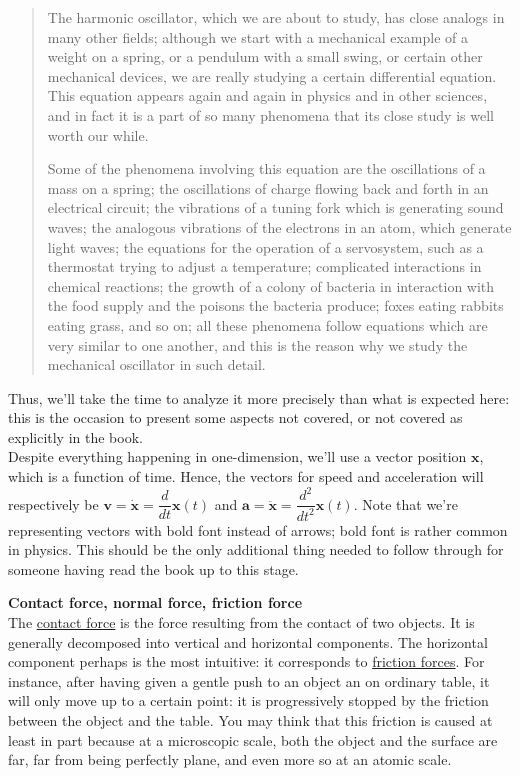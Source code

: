 \documentclass[solutions.tex]{subfiles}
\renewcommand{\bm}[1]{\pmb{#1}}
\begin{document}
\begin{quote}
The harmonic oscillator, which we are about to study, has close analogs in many
other fields; although we start with a mechanical example of a weight on a spring,
or a pendulum with a small swing, or certain other mechanical devices, we are
really studying a certain differential equation. This equation appears again
and again in physics and in other sciences, and in fact it is a part of so
many phenomena that its close study is well worth our while.

Some of the phenomena involving this equation are the oscillations of a
mass on a spring; the oscillations of charge flowing back and forth in
an electrical circuit; the vibrations of a tuning fork which is generating
sound waves; the analogous vibrations of the electrons in an atom, which
generate light waves; the equations for the operation of a servosystem,
such as a thermostat trying to adjust a temperature; complicated
interactions in chemical reactions; the growth of a colony of bacteria
in interaction with the food supply and the poisons the bacteria produce;
foxes eating rabbits eating grass, and so on; all these phenomena follow
equations which are very similar to one another, and this is the reason
why we study the mechanical oscillator in such detail.
\end{quote}

Thus, we'll take the time to analyze it more precisely than what
is expected here: this is the occasion to present some aspects not
covered, or not covered as explicitly in the book. \\

Despite everything happening in one-dimension, we'll use a
vector position $\bm{x}$, which is a function of time. Hence, the vectors
for speed and acceleration will respectively be $\bm{v}=\dot{\bm{x}} =
\dfrac{d}{dt}\bm{x}(t)$ and $\bm{a}=\ddot{\bm{x}} = \dfrac{d^2}{dt^2}\bm{x}(t)$.
Note that we're representing vectors with bold font instead of
arrows; bold font is rather common in physics. This should be the only
additional thing needed to follow through for someone having read the
book up to this stage.

\hr
\textbf{Contact force, normal force, friction force} \\
The \href{https://en.wikipedia.org/wiki/Contact\_force}{contact force}
is the force resulting from the contact of two objects. It is generally decomposed
into vertical and horizontal components. The horizontal component perhaps
is the most intuitive: it corresponds to
\href{https://en.wikipedia.org/wiki/Friction}{friction forces}. For
instance, after having given a gentle push to an object an on ordinary table,
it will only move up to a certain point: it is progressively stopped by
the friction between the object and the table. You may think that this friction
is caused at least in part because at a microscopic scale, both the object
and the surface are far, far from being perfectly plane, and even more
so at an atomic scale. \\
\end{document}
